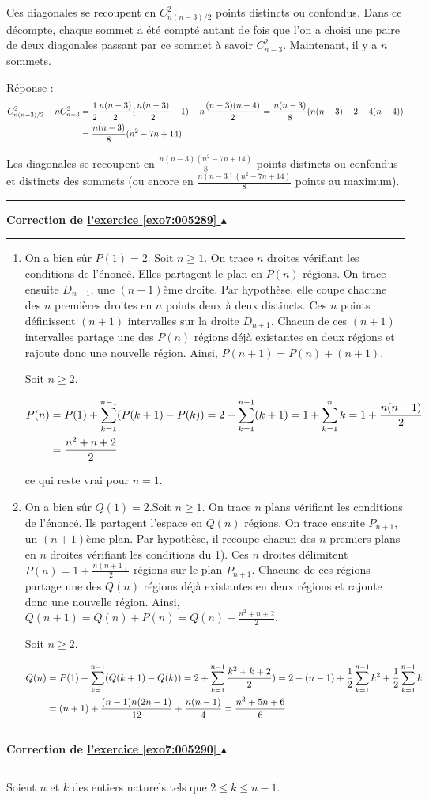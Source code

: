 \documentclass[11pt,a4paper]{article}
\newcounter{exo}
\newcommand{\correction}[1]{\hypertarget{cor7:#1}{}\label{cor7:#1}{\bf Correction de \hyperlink{exo7:#1}{l'exercice \ref{exo7:#1} $\blacktriangle$}}\vspace{1mm}\hrule\vspace{1mm}}
\newcommand{\fincorrection}{\vspace{1mm}\hrule\vspace*{7mm}}
\begin{document}
Ces diagonales se recoupent en $C_{n(n-3)/2}^2$ points distincts ou confondus. Dans ce décompte, chaque sommet a été compté autant de fois que l'on a choisi une paire de deux diagonales passant par ce sommet à savoir $C_{n-3}^2$. Maintenant, il y a $n$ sommets.

Réponse : 
\begin{align*}\ensuremath 
C_{n(n-3)/2}^2-nC_{n-3}^2&=\frac{1}{2}\frac{n(n-3)}{2}(\frac{n(n-3)}{2}-1)-n\frac{(n-3)(n-4)}{2}=\frac{n(n-3)}{8}(n(n-3)-2-4(n-4))\\
 &=\frac{n(n-3)}{8}(n^2-7n+14)
\end{align*}

Les diagonales se recoupent en $\frac{n(n-3)(n^2-7n+14)}{8}$ points distincts ou confondus et distincts des sommets (ou encore en $\frac{n(n-3)(n^2-7n+14)}{8}$ points au maximum).
\fincorrection
\correction{005289}
\begin{enumerate}
\item  On a bien sûr $P(1)=2$. Soit $n\geq1$. On trace $n$ droites vérifiant les conditions de l'énoncé. Elles partagent le plan en $P(n)$ régions. On trace ensuite $D_{n+1}$, une $(n+1)$ème droite. Par hypothèse, elle coupe chacune des $n$ premières droites en $n$ points deux à deux distincts. Ces $n$ points définissent $(n+1)$ intervalles sur la droite $D_{n+1}$. Chacun de ces $(n+1)$ intervalles partage une des $P(n)$ régions déjà existantes en deux régions et rajoute donc une nouvelle région. Ainsi, $P(n+1)=P(n)+(n+1)$.

Soit $n\geq2$.

\begin{align*}\ensuremath
P(n)&=P(1)+\sum_{k=1}^{n-1}(P(k+1)-P(k))=2+\sum_{k=1}^{n-1}(k+1)=1+\sum_{k=1}^{n}k=1+\frac{n(n+1)}{2}\\
 &=\frac{n^2+n+2}{2}
\end{align*}

ce qui reste vrai pour $n=1$.

\item  On a bien sûr $Q(1)=2$.Soit $n\geq1$. On trace $n$ plans vérifiant les conditions de l'énoncé. Ils partagent l'espace en $Q(n)$ régions. On trace ensuite $P_{n+1}$, un $(n+1)$ème plan. Par hypothèse, il recoupe chacun des $n$ premiers plans en $n$ droites vérifiant les conditions du 1). Ces $n$ droites délimitent $P(n)=1+\frac{n(n+1)}{2}$ régions sur le plan $P_{n+1}$. Chacune de ces régions partage une des $Q(n)$ régions déjà existantes en deux régions et rajoute donc une nouvelle région. Ainsi, $Q(n+1)=Q(n)+P(n)=Q(n)+\frac{n^2+n+2}{2}$.

Soit $n\geq2$.

\begin{align*}\ensuremath
Q(n)&=P(1)+\sum_{k=1}^{n-1}(Q(k+1)-Q(k))=2+\sum_{k=1}^{n-1}\frac{k^2+k+2}{2})=2+(n-1)+\frac{1}{2}\sum_{k=1}^{n-1}k^2+\frac{1}{2}\sum_{k=1}^{n-1}k\\
 &=(n+1)+\frac{(n-1)n(2n-1)}{12}+\frac{n(n-1)}{4}=\frac{n^3+5n+6}{6}
\end{align*}
\end{enumerate}
\fincorrection
\correction{005290}
Soient $n$ et $k$ des entiers naturels tels que $2\leq k\leq n-1$.
\end{document}

